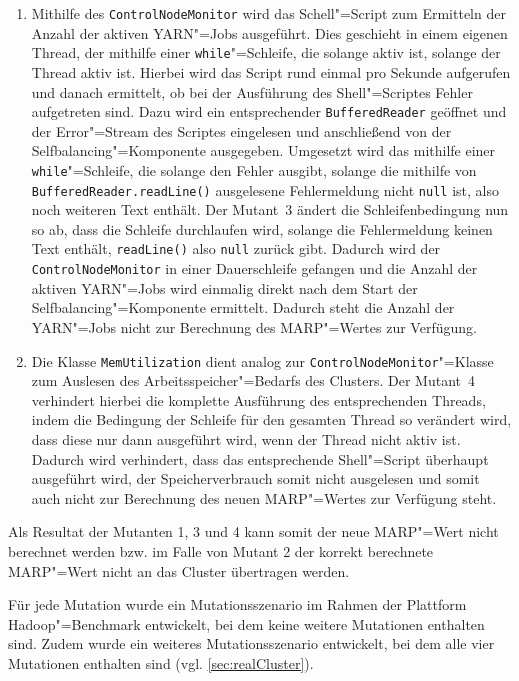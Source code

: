 \begin{enumerate}[itemsep=5pt]
    \item
    Mithilfe des \texttt{ControlNodeMonitor} wird das Schell"=Script zum Ermitteln der Anzahl der aktiven YARN"=Jobs ausgeführt.
    Dies geschieht in einem eigenen Thread, der mithilfe einer \texttt{while}"=Schleife, die solange aktiv ist, solange der Thread aktiv ist.
    Hierbei wird das Script rund einmal pro Sekunde aufgerufen und danach ermittelt, ob bei der Ausführung des Shell"=Scriptes Fehler aufgetreten sind.
    Dazu wird ein entsprechender \texttt{BufferedReader} geöffnet und der Error"=Stream des Scriptes eingelesen und anschließend von der Selfbalancing"=Komponente ausgegeben.
    Umgesetzt wird das mithilfe einer \texttt{while}"=Schleife, die solange den Fehler ausgibt, solange die mithilfe von \texttt{BufferedReader.readLine()} ausgelesene Fehlermeldung nicht \texttt{null} ist, also noch weiteren Text enthält.
    Der Mutant~3 ändert die Schleifenbedingung nun so ab, dass die Schleife durchlaufen wird, solange die Fehlermeldung keinen Text enthält, \texttt{readLine()} also \texttt{null} zurück gibt.
    Dadurch wird der \texttt{ControlNodeMonitor} in einer Dauerschleife gefangen und die Anzahl der aktiven YARN"=Jobs wird einmalig direkt nach dem Start der Selfbalancing"=Komponente ermittelt.
    Dadurch steht die Anzahl der YARN"=Jobs nicht zur Berechnung des \gls{MARP}"=Wertes zur Verfügung.
            
    \item
    Die Klasse \texttt{MemUtilization} dient analog zur \texttt{ControlNodeMonitor}"=Klasse zum Auslesen des Arbeitsspeicher"=Bedarfs des Clusters.
    Der Mutant~4 verhindert hierbei die komplette Ausführung des entsprechenden Threads, indem die Bedingung der Schleife für den gesamten Thread so verändert wird, dass diese nur dann ausgeführt wird, wenn der Thread nicht aktiv ist.
    Dadurch wird verhindert, dass das entsprechende Shell"=Script überhaupt ausgeführt wird, der Speicherverbrauch somit nicht ausgelesen und somit auch nicht zur Berechnung des neuen \gls{MARP}"=Wertes zur Verfügung steht.
\end{enumerate}

Als Resultat der Mutanten 1, 3 und 4 kann somit der neue \gls{MARP}"=Wert nicht berechnet werden bzw. im Falle von Mutant 2 der korrekt berechnete \gls{MARP}"=Wert nicht an das Cluster übertragen werden.

Für jede Mutation wurde ein Mutationsszenario im Rahmen der Plattform Hadoop"=Benchmark entwickelt, bei dem keine weitere Mutationen enthalten sind.
Zudem wurde ein weiteres Mutationsszenario entwickelt, bei dem alle vier Mutationen enthalten sind (vgl. \cref{sec:realCluster}).
